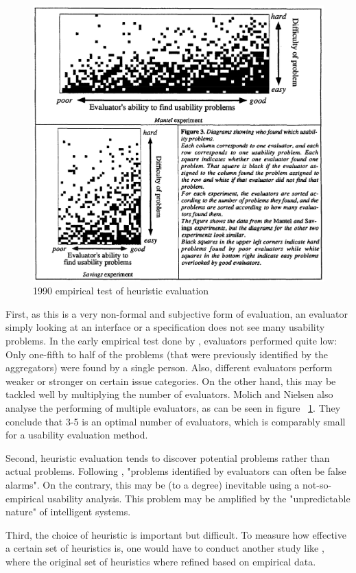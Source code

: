 \documentclass[sigchi]{acmart}
\begin{document}
\begin{figure}[h]
  \centering
  \includegraphics[width=0.8\linewidth]{performance-evaluators}
  \caption{1990 \citeauthor{heureval1990} empirical test of heuristic evaluation\cite{heureval1990}}
  \label{fig:perf}
\end{figure}

First, as this is a very non-formal and subjective form of evaluation, an evaluator simply looking at an interface or a specification does not see many usability problems. In the early empirical test done by \citeauthor{heureval1990}, evaluators performed quite low: Only one-fifth to half of the problems (that were previously identified by the aggregators) were found by a single person. Also, different evaluators perform weaker or stronger on certain issue categories.
On the other hand, this may be tackled well by multiplying the number of evaluators. Molich and Nielsen also analyse the performing of multiple evaluators, as can be seen in figure ~\ref{fig:perf}. They conclude that 3-5 is an optimal number of evaluators, which is comparably small for a usability evaluation method.

Second, heuristic evaluation tends to discover potential problems rather than actual problems. Following \citeauthor{howtoeval2020}, "problems identified by evaluators can often be false alarms". On the contrary, this may be (to a degree) inevitable using a not-so-empirical usability analysis. This problem may be amplified by the "unpredictable nature" of intelligent systems.

Third, the choice of heuristic is important but difficult. To measure how effective a certain set of heuristics is, one would have to conduct another study like \cite{enhanceheuristics1994}, where the original set of heuristics where refined based on empirical data.
\end{document}
